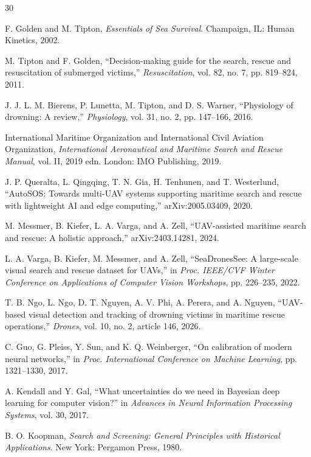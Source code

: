 \documentclass[runningheads]{llncs}
\begin{document}
\clearpage
\begin{thebibliography}{30}

F. Golden and M. Tipton, \textit{Essentials of Sea Survival}. Champaign, IL: Human Kinetics, 2002.

M. Tipton and F. Golden, ``Decision-making guide for the search, rescue and resuscitation of submerged victims,'' \textit{Resuscitation}, vol. 82, no. 7, pp. 819--824, 2011.

J. J. L. M. Bierens, P. Lunetta, M. Tipton, and D. S. Warner, ``Physiology of drowning: A review,'' \textit{Physiology}, vol. 31, no. 2, pp. 147--166, 2016.

International Maritime Organization and International Civil Aviation Organization, \textit{International Aeronautical and Maritime Search and Rescue Manual}, vol. II, 2019 edn. London: IMO Publishing, 2019.

J. P. Queralta, L. Qingqing, T. N. Gia, H. Tenhunen, and T. Westerlund, ``AutoSOS: Towards multi-UAV systems supporting maritime search and rescue with lightweight AI and edge computing,'' arXiv:2005.03409, 2020.

M. Messmer, B. Kiefer, L. A. Varga, and A. Zell, ``UAV-assisted maritime search and rescue: A holistic approach,'' arXiv:2403.14281, 2024.

L. A. Varga, B. Kiefer, M. Messmer, and A. Zell, ``SeaDronesSee: A large-scale visual search and rescue dataset for UAVs,'' in \textit{Proc. IEEE/CVF Winter Conference on Applications of Computer Vision Workshops}, pp. 226--235, 2022.

T. B. Ngo, L. Ngo, D. T. Nguyen, A. V. Phi, A. Perera, and A. Nguyen, ``UAV-based visual detection and tracking of drowning victims in maritime rescue operations,'' \textit{Drones}, vol. 10, no. 2, article 146, 2026.

C. Guo, G. Pleiss, Y. Sun, and K. Q. Weinberger, ``On calibration of modern neural networks,'' in \textit{Proc. International Conference on Machine Learning}, pp. 1321--1330, 2017.

A. Kendall and Y. Gal, ``What uncertainties do we need in Bayesian deep learning for computer vision?'' in \textit{Advances in Neural Information Processing Systems}, vol. 30, 2017.

B. O. Koopman, \textit{Search and Screening: General Principles with Historical Applications}. New York: Pergamon Press, 1980.


\end{thebibliography}
\end{document}
